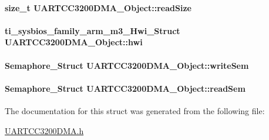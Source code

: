 \paragraph[{read\-Size}]{\setlength{\rightskip}{0pt plus 5cm}size\-\_\-t U\-A\-R\-T\-C\-C3200\-D\-M\-A\-\_\-\-Object\-::read\-Size}\label{struct_u_a_r_t_c_c3200_d_m_a___object_a77030d6b64ed16de385d3b804b3db99e}
\paragraph[{hwi}]{\setlength{\rightskip}{0pt plus 5cm}ti\-\_\-sysbios\-\_\-family\-\_\-arm\-\_\-m3\-\_\-\-Hwi\-\_\-\-Struct U\-A\-R\-T\-C\-C3200\-D\-M\-A\-\_\-\-Object\-::hwi}\label{struct_u_a_r_t_c_c3200_d_m_a___object_a6a8ccf6c1e0bd514f7610ec17cbdf0a8}
\paragraph[{write\-Sem}]{\setlength{\rightskip}{0pt plus 5cm}Semaphore\-\_\-\-Struct U\-A\-R\-T\-C\-C3200\-D\-M\-A\-\_\-\-Object\-::write\-Sem}\label{struct_u_a_r_t_c_c3200_d_m_a___object_affd1ce743433cdffdbbe0c0b9d8aca3b}
\paragraph[{read\-Sem}]{\setlength{\rightskip}{0pt plus 5cm}Semaphore\-\_\-\-Struct U\-A\-R\-T\-C\-C3200\-D\-M\-A\-\_\-\-Object\-::read\-Sem}\label{struct_u_a_r_t_c_c3200_d_m_a___object_a7a64516d23436d142ad53025c69f9376}


The documentation for this struct was generated from the following file\-:\begin{DoxyCompactItemize}
\item 
\hyperlink{_u_a_r_t_c_c3200_d_m_a_8h}{U\-A\-R\-T\-C\-C3200\-D\-M\-A.\-h}\end{DoxyCompactItemize}
